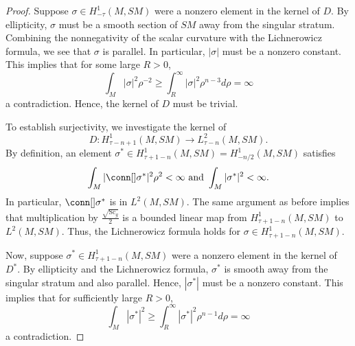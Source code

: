 \documentclass[12pt, reqno]{amsart}
\theoremstyle{plain} %
\theoremstyle{definition}
\theoremstyle{remark}
\numberwithin{equation}{section}
\newcommand{\pnorm}[1]{| #1 |}
\newcommand{\Sc}{\mathrm{Sc}}
\begin{document}
\begin{proof}
    Suppose \(\sigma \in H_{-\tau}^1(M, SM)\) were a nonzero element in the kernel of \(D\).
    By ellipticity, \(\sigma\) must be a smooth section of \(SM\) away from the singular stratum.
    Combining the nonnegativity of the scalar curvature with the Lichnerowicz formula, we see that \(\sigma\) is parallel.
    In particular, \(\pnorm{\sigma}\) must be a nonzero constant.
    This implies that for some large \(R > 0\),
    \begin{equation*}
        \int_M \pnorm{\sigma}^2 \rho^{-2} \geq \int_{R}^{\infty} \pnorm{\sigma}^2 \rho^{n-3} d\rho = \infty
    \end{equation*}
    a contradiction.
    Hence, the kernel of \(D\) must be trivial.

    To establish surjectivity, we investigate the kernel of
    \begin{equation*}
        D \colon H_{\tau - n + 1}^1(M, SM) \to L_{\tau - n}^2(M, SM).
    \end{equation*}
    By definition, an element \(\sigma^* \in H_{\tau + 1 - n}^1(M, SM) = H_{-n/2}^1(M, SM)\) satisfies
    \begin{equation*}
        \int_M \pnorm{\conn[] \sigma^*}^2 \rho^2 < \infty \text{ and } \int_M \pnorm{\sigma^*}^2 < \infty.
    \end{equation*}
    In particular, \(\conn[] \sigma^*\) is in \(L^2(M, SM)\).
    The same argument as before implies that multiplication by \(\frac{\sqrt{\Sc_g}}{2}\) is a bounded linear map from \(H_{\tau + 1 - n}^1(M, SM)\) to \(L^2(M, SM)\).
    Thus, the Lichnerowicz formula holds for \(\sigma \in H_{\tau + 1 - n}^1(M, SM)\).

    Now, suppose \(\sigma^* \in H_{\tau+1-n}^1(M, SM)\) were a nonzero element in the kernel of \(D^*\).
    By ellipticity and the Lichnerowicz formula, \(\sigma^*\) is smooth away from the singular stratum and also parallel.
    Hence, \(\pnorm{\sigma^*}\) must be a nonzero constant.
    This implies that for sufficiently large \(R > 0\),
    \begin{equation*}
        \int_M \pnorm{\sigma^*}^2 \geq \int_R^\infty \pnorm{\sigma^*}^2 \rho^{n-1} d\rho = \infty
    \end{equation*}
    a contradiction.
\end{proof}
\end{document}
